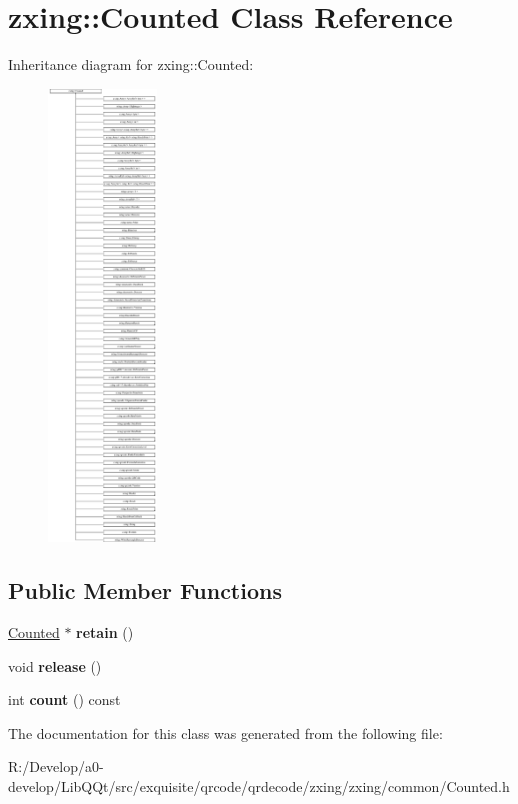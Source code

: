 \hypertarget{classzxing_1_1_counted}{}\section{zxing\+:\+:Counted Class Reference}
\label{classzxing_1_1_counted}
Inheritance diagram for zxing\+:\+:Counted\+:\begin{figure}[H]
\begin{center}
\leavevmode
\includegraphics[height=12.000000cm]{classzxing_1_1_counted}
\end{center}
\end{figure}
\subsection*{Public Member Functions}
\begin{DoxyCompactItemize}
\item 
\mbox{\label{classzxing_1_1_counted_af047acf66444dfd684b3ef16b96c8abd}} 
\mbox{\hyperlink{classzxing_1_1_counted}{Counted}} $\ast$ {\bfseries retain} ()
\item 
\mbox{\label{classzxing_1_1_counted_a34015014640d6d7b1bae4b116deaaa70}} 
void {\bfseries release} ()
\item 
\mbox{\label{classzxing_1_1_counted_a8eaaffdfcfb10f2b48d2e2e7ffdd9d6d}} 
int {\bfseries count} () const
\end{DoxyCompactItemize}


The documentation for this class was generated from the following file\+:\begin{DoxyCompactItemize}
\item 
R\+:/\+Develop/a0-\/develop/\+Lib\+Q\+Qt/src/exquisite/qrcode/qrdecode/zxing/zxing/common/Counted.\+h\end{DoxyCompactItemize}
